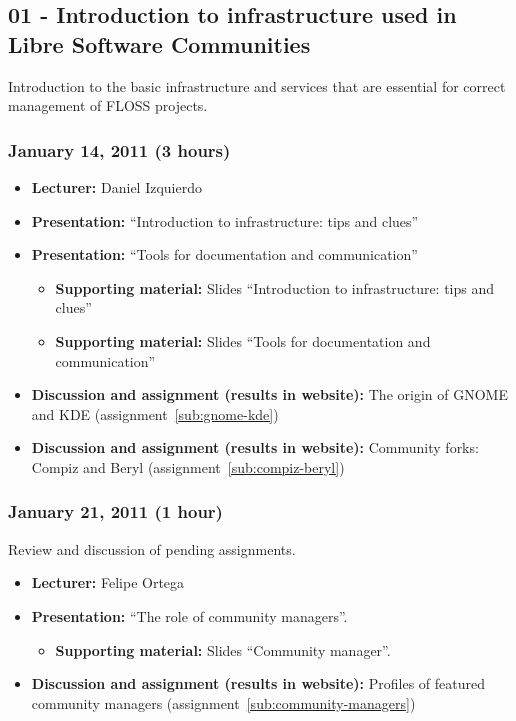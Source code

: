 \documentclass[a4paper]{article}
\begin{document}
\subsection{01 - Introduction to infrastructure used in Libre Software Communities}

Introduction to the basic infrastructure and services that are essential for correct management of FLOSS projects.

\subsubsection{January 14, 2011 (3 hours)}

\begin{itemize}
\item \textbf{Lecturer:} Daniel Izquierdo
\item \textbf{Presentation:} ``Introduction to infrastructure: tips and clues''
\item \textbf{Presentation:} ``Tools for documentation and communication''
  \begin{itemize}
  \item \textbf{Supporting material:} Slides ``Introduction to infrastructure: tips and clues''
  \item \textbf{Supporting material:} Slides ``Tools for documentation and communication''
  \end{itemize}
\item \textbf{Discussion and assignment (results in website):} The origin of GNOME and KDE (assignment~\ref{sub:gnome-kde})
\item \textbf{Discussion and assignment (results in website):} Community forks: Compiz and Beryl (assignment~\ref{sub:compiz-beryl})
\end{itemize}

\subsubsection{January 21, 2011 (1 hour)}

Review and discussion of pending assignments.

\begin{itemize}
\item \textbf{Lecturer:} Felipe Ortega
 \item \textbf{Presentation:} ``The role of community managers''.
    \begin{itemize}
      \item \textbf{Supporting material:} Slides ``Community manager''.
    \end{itemize}
\item \textbf{Discussion and assignment (results in website):} Profiles of featured community managers (assignment~\ref{sub:community-managers})
\end{itemize}
\end{document}
